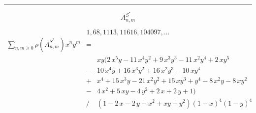 \documentclass[12pt]{article}
\theoremstyle{plain}
\theoremstyle{definition}
\theoremstyle{remark}
\theoremstyle{definition}
\newcommand{\cell}[4]{\filldraw[gray!40] ( #1 , #2 ) rectangle ( #3 , #4 ); \draw[thick] ( #1 , #2 ) rectangle ( #3 , #4 );}
\newcommand{\cellw}[4]{\draw[thick] ( #1 , #2 ) rectangle ( #3 , #4 );}
\begin{document}
\medskip\hrule\medskip
$$A^{S^*}_{n,m}$$
\begin{center}
\end{center}

$$1, 68, 1113, 11616, 104097,\dots$$
\begin{eqnarray*}
    \sum_{n,m\geq 0} \rho(A^{S^*}_{n,m})x^n y^m & = & \\
    & & xy(2 \, x^{5} y - 11 \, x^{4} y^{2} + 9 \, x^{3} y^{3} - 11 \, x^{2} y^{4} + 2 \, x y^{5} \\
    & - & 10 \, x^{4} y + 16 \, x^{3} y^{2} + 16 \, x^{2} y^{3} - 10 \, x y^{4}\\
    & + & x^{4} + 15 \, x^{3} y - 21 \, x^{2} y^{2} + 15 \, x y^{3} + y^{4} - 8 \, x^{2} y - 8 \, x y^{2} \\
    & - & 4 \, x^{2} + 5 \, x y - 4 \, y^{2} + 2 \, x + 2 \, y + 1 ) \\
    & / & {\left(1 - 2 \, x - 2 \, y + x^{2} + x y + y^{2} \right)} {\left(1-x\right)}^{4} {\left(1-y\right)}^{4}
\end{eqnarray*}
\end{document}

